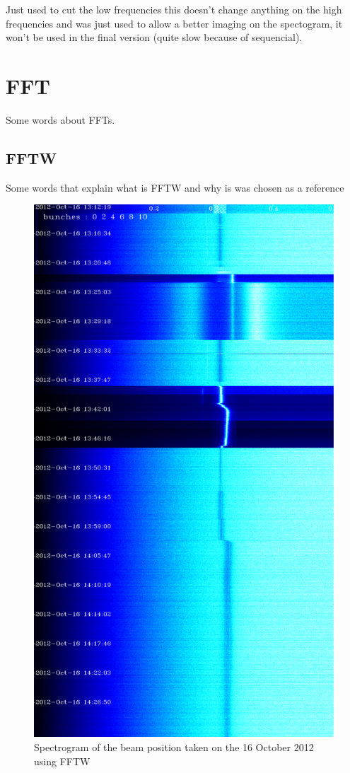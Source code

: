 Just used to cut the low frequencies this doesn't change anything on the high frequencies and was just used to allow a better imaging on the spectogram, it won't be used in the final version (quite slow because of sequencial).

\section{FFT}

Some words about FFTs.

   \subsection{FFTW}

   Some words that explain what is FFTW and why is was chosen as a reference

\begin{figure}
\caption{Spectrogram of the beam position taken on the 16 October 2012 using FFTW}
\centering
\includegraphics[scale=0.3]
{md-121016-vb1-m1-6bunches-10acc-fftw-cpu.pdf}
\end{figure}


